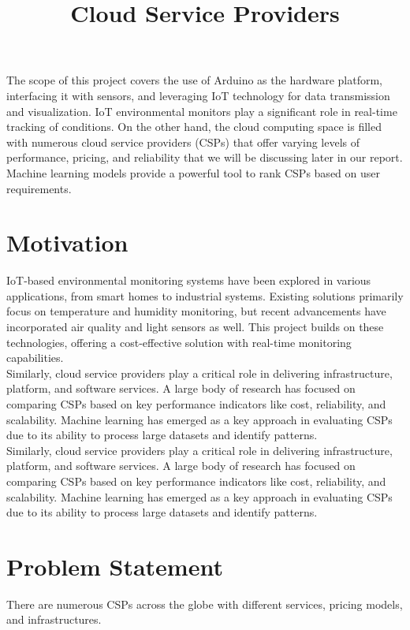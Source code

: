 \documentclass[12pt]{report}
\begin{document}
	\raggedright
	The scope of this project covers the use of Arduino as the hardware platform, interfacing it
	with sensors, and leveraging IoT technology for data transmission and visualization. IoT
	environmental monitors play a significant role in real-time tracking of conditions. On the
	other hand, the cloud computing space is filled with numerous cloud service providers
	(CSPs) that offer varying levels of performance, pricing, and reliability that we will be
	discussing later in our report. Machine learning models provide a powerful tool to rank
	CSPs based on user requirements.\\
	
	\section*{Motivation}
	IoT-based environmental monitoring systems have been explored in various applications,
	from smart homes to industrial systems. Existing solutions primarily focus on temperature
	and humidity monitoring, but recent advancements have incorporated air quality and light
	sensors as well. This project builds on these technologies, offering a cost-effective solution
	with real-time monitoring capabilities.\\
	
	Similarly, cloud service providers play a critical role in delivering infrastructure, platform,
	and software services. A large body of research has focused on comparing CSPs based on
	key performance indicators like cost, reliability, and scalability. Machine learning has
	emerged as a key approach in evaluating CSPs due to its ability to process large datasets and
	identify patterns.\\
	
	Similarly, cloud service providers play a critical role in delivering infrastructure, platform,
	and software services. A large body of research has focused on comparing CSPs based on
	key performance indicators like cost, reliability, and scalability. Machine learning has
	emerged as a key approach in evaluating CSPs due to its ability to process large datasets and
	identify patterns.\\
	
	\section*{Problem Statement}
	\title{\large Cloud Service Providers}
	There are numerous CSPs across the globe with different services, pricing models, and
	infrastructures.\\
	
\end{document}
